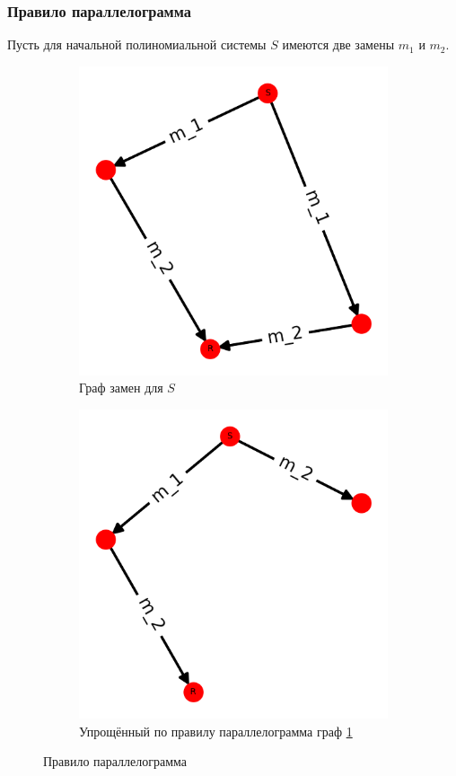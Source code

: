 \subsubsection{Правило параллелограмма}

Пусть для начальной полиномиальной системы $S$ имеются две замены $m_1$ и $m_2$.

\begin{figure}
\begin{subfigure}{.4\textwidth}
  \centering
  \includegraphics[width=0.8\linewidth]{chapters/images/parallel.png}  
  \caption{Граф замен для $S$}
  \label{fig:parallel-replacement-graph}
\end{subfigure}
\begin{subfigure}{.4\textwidth}
  \centering
  \includegraphics[width=0.8\linewidth]{chapters/images/parallel_red.png}  
  \caption{Упрощённый по правилу параллелограмма граф \ref{fig:parallel-replacement-graph}}
  \label{fig:parallel-replacement-graph-red}
\end{subfigure}
\caption{Правило параллелограмма}
\label{fig:parallel-rule}
\end{figure}


